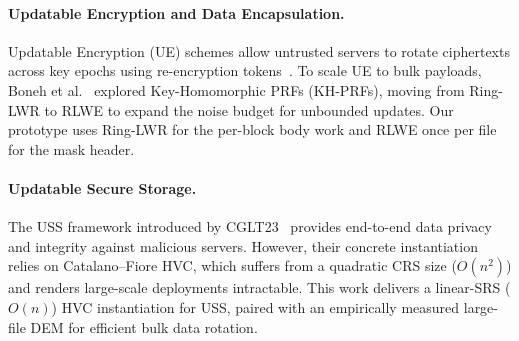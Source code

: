 \paragraph{Updatable Encryption and Data Encapsulation.}
Updatable Encryption (UE) schemes allow untrusted servers to rotate ciphertexts across key epochs using re-encryption tokens~\cite{EPRS17,LT18,SHINE}. 
To scale UE to bulk payloads, Boneh et al.~\cite{BDGJ20} explored Key-Homomorphic PRFs (KH-PRFs), moving from Ring-LWR to RLWE to expand the noise budget for unbounded updates. 
Our prototype uses Ring-LWR for the per-block body work and RLWE once per file for the mask header.

\paragraph{Updatable Secure Storage.}
The USS framework introduced by CGLT23~\cite{CGLT23} provides end-to-end data privacy and integrity against malicious servers. 
However, their concrete instantiation relies on Catalano--Fiore HVC, which suffers from a quadratic CRS size ($O(n^2)$) and renders large-scale deployments intractable. 
This work delivers a linear-SRS ($O(n)$) HVC instantiation for USS, paired with an empirically measured large-file DEM for efficient bulk data rotation.
